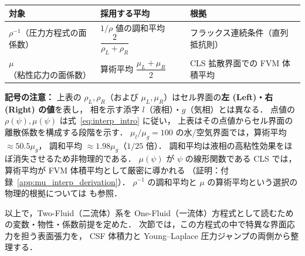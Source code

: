 \begin{tcolorbox}[mybox, title={点値補間と面係数：$\rho^{-1}$ には調和平均，$\mu$ には算術平均}]
\begin{center}
\renewcommand{\arraystretch}{\PaperTableArrayStretch}
\begin{tabular}{lll}
\hline
対象 & 採用する平均 & 根拠 \\
\hline
$\rho^{-1}$（圧力方程式の面係数）& $1/\rho$ 値の調和平均 $\dfrac{2}{\rho_L+\rho_R}$ & フラックス連続条件（直列抵抗則） \\[6pt]
$\mu$（粘性応力の面係数）& 算術平均 $\dfrac{\mu_L+\mu_R}{2}$ & CLS 拡散界面での FVM 体積平均 \\
\hline
\end{tabular}
\end{center}
\smallskip
\noindent\textbf{記号の注意：}
上表の $\rho_L, \rho_R$（および $\mu_L, \mu_R$）はセル界面の\textbf{左 (Left)・右 (Right) の値}を表し，
相を示す添字 $l$（液相）・$g$（気相）とは異なる．
点値の $\rho(\psi),\mu(\psi)$ は式~\eqref{eq:interp_intro} に従い，
上表はその点値からセル界面の離散係数を構成する段階を示す．
\medskip
$\mu_l/\mu_g = 100$ の水/空気界面では，算術平均 $\approx 50.5\mu_g$，
調和平均 $\approx 1.98\mu_g$（$1/25$ 倍）．
調和平均は液相の高粘性効果をほぼ消失させるため非物理的である．
$\mu(\psi)$ が $\psi$ の線形関数である CLS では，算術平均が FVM 体積平均として厳密に導かれる
（証明：付録~\ref{app:mu_interp_derivation}）．
$\rho^{-1}$ の調和平均と $\mu$ の算術平均という選択の物理的根拠については
\cite{Prosperetti1981, Sussman2000, Kang2000} も参照．
\end{tcolorbox}

\medskip
以上で，Two-Fluid（二流体）系を One-Fluid（一流体）方程式として読むための変数・物性・係数前提を定めた．
次節では，この方程式の中で特異な界面応力を担う表面張力を，
CSF 体積力と Young--Laplace 圧力ジャンプの両側から整理する．
